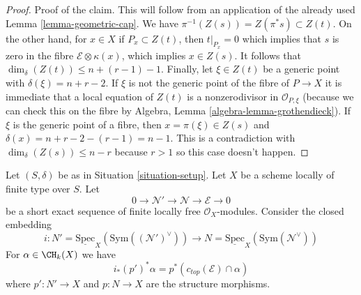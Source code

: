 \begin{proof}
\medskip\noindent
Proof of the claim. This will follow from an application of
the already used Lemma \ref{lemma-geometric-cap}.
We have $\pi^{-1}(Z(s)) = Z(\pi^*s) \subset Z(t)$.
On the other hand, for $x \in X$ if $P_x \subset Z(t)$, then
$t|_{P_x} = 0$ which implies that $s$ is zero in the fibre
$\mathcal{E} \otimes \kappa(x)$, which implies $x \in Z(s)$.
It follows that $\dim_\delta(Z(t)) \leq n + (r - 1) - 1$.
Finally, let $\xi \in Z(t)$ be a generic point with
$\delta(\xi) = n + r - 2$. If $\xi$ is not the generic point
of the fibre of $P \to X$ it is immediate that
a local equation of $Z(t)$ is a nonzerodivisor in $\mathcal{O}_{P, \xi}$
(because we can check this on the fibre by
Algebra, Lemma \ref{algebra-lemma-grothendieck}).
If $\xi$ is the generic point of a fibre, then $x = \pi(\xi) \in Z(s)$
and $\delta(x) = n + r - 2 - (r - 1) = n - 1$. This is a contradiction
with $\dim_\delta(Z(s)) \leq n - r$ because $r > 1$
so this case doesn't happen.
\end{proof}

\begin{lemma}
\label{lemma-easy-virtual-class}
Let $(S, \delta)$ be as in Situation \ref{situation-setup}. Let $X$
be a scheme locally of finite type over $S$. Let
$$
0 \to \mathcal{N}' \to \mathcal{N} \to \mathcal{E} \to 0
$$
be a short exact sequence of finite locally free $\mathcal{O}_X$-modules.
Consider the closed embedding
$$
i :
N' = \underline{\text{Spec}}_X(\text{Sym}((\mathcal{N}')^\vee))
\longrightarrow
N = \underline{\text{Spec}}_X(\text{Sym}(\mathcal{N}^\vee))
$$
For $\alpha \in \CH_k(X)$ we have
$$
i_*(p')^*\alpha = p^*(c_{top}(\mathcal{E}) \cap \alpha)
$$
where $p' : N' \to X$ and $p : N \to X$ are the structure morphisms.
\end{lemma}

